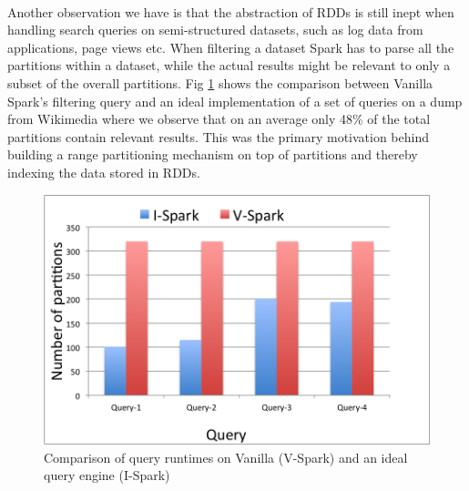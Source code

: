 \paragraph{}
Another observation we have is that the abstraction of RDDs is still
inept when handling search queries on semi-structured datasets, such as
log data from applications, page views etc. When filtering a dataset
Spark has to parse all the partitions within a dataset, while the actual
results might be relevant to only a subset of the overall partitions.
Fig \ref{fig:fig2} shows the comparison between Vanilla Spark's
filtering query and an ideal implementation of a set of queries on a
dump from Wikimedia \cite{wikimedia} where we observe that on an average
only 48\% of the total partitions contain relevant results. This was the
primary motivation behind building a range partitioning mechanism on top
of partitions and thereby indexing the data stored in RDDs.

\begin{figure}[!ht]
\caption{Comparison of query runtimes on Vanilla (V-Spark) and an ideal query engine (I-Spark)}
\label{fig:fig2}
\includegraphics[scale=0.50]{./images/image2.png}
\end{figure}

